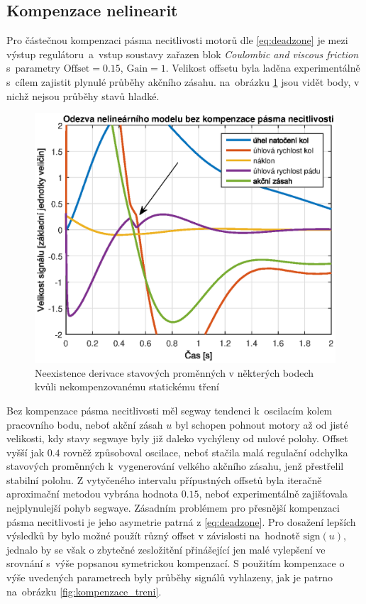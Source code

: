\documentclass[conference]{IEEEtran}
\begin{document}
\subsection{Kompenzace nelinearit}
 Pro částečnou kompenzaci pásma necitlivosti motorů dle \eqref{eq:deadzone} je mezi výstup regulátoru~a~vstup soustavy
zařazen blok \textit{Coulombic and viscous friction} s~parametry $\text{Offset} = 0.15$, $\text{Gain} = 1$. Velikost offsetu byla laděna
experimentálně s~cílem zajistit plynulé průběhy akčního zásahu. na~obrázku \ref{fig:bez_kompenzace_treni} jsou vidět body, v nichž nejsou průběhy stavů hladké.
\begin{figure}[htbp]
    \centerline{\includegraphics[width=\linewidth]{regulace_bez_kompenzace_treni.eps}}
    \caption{Neexistence derivace stavových proměnných v některých bodech kvůli nekompenzovanému statickému tření}
    \label{fig:bez_kompenzace_treni}        
\end{figure}

Bez kompenzace pásma necitlivosti měl segway tendenci k~oscilacím kolem pracovního bodu, neboť akční zásah $u$ byl schopen pohnout motory
až od jisté velikosti, kdy stavy segwaye byly již daleko vychýleny od nulové polohy.
Offset vyšší jak $0.4$ rovněž způsoboval oscilace, neboť stačila malá regulační odchylka stavových proměnných k~vygenerování velkého akčního zásahu,
jenž přestřelil stabilní polohu.
Z vytyčeného intervalu přípustných offsetů byla iteračně aproximační metodou vybrána hodnota $0.15$,
neboť experimentálně zajišťovala nejplynulejší pohyb segwaye.
Zásadním problémem pro přesnější kompenzaci pásma necitlivosti je jeho asymetrie patrná z \eqref{eq:deadzone}. Pro dosažení lepších výsledků by bylo možné
použít různý offset v závislosti na~hodnotě $\text{sign}(u)$, jednalo by se však o zbytečné zesložitění přinášející jen malé vylepšení
ve srovnání s~výše popsanou symetrickou kompenzací.
S použitím kompenzace o výše uvedených parametrech byly průběhy signálů vyhlazeny, jak je patrno na~obrázku \ref{fig:kompenzace_treni}. 
\end{document}
